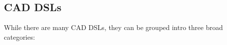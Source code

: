 


\subsection{CAD DSLs}
\label{sec:background}
While there are many CAD DSLs, they can be grouped intro three broad categories: %

